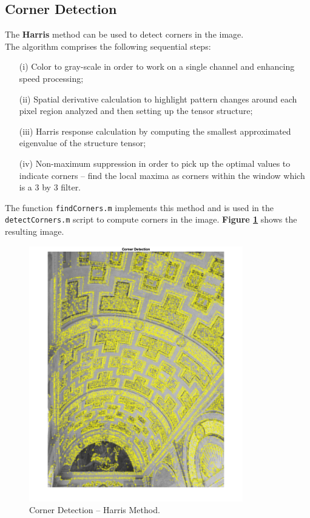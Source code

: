 \documentclass[12pt,a4paper]{article}
\begin{document}
\subsection{Corner Detection}
\label{sec:cornerDetection}
The \textbf{Harris} method can be used to detect corners in the image.\\

The algorithm comprises the following sequential steps:
\begin{itemize}
    \item[(i)] Color to gray-scale in order to work on a single channel and enhancing speed processing;
    \item[(ii)] Spatial derivative calculation to highlight pattern changes around each pixel region analyzed and then setting up the tensor structure;
    \item[(iii)] Harris response calculation by computing the smallest approximated eigenvalue of the structure tensor;
    \item[(iv)] Non-maximum suppression in order to pick up the optimal values to indicate corners -- find the local maxima as corners within the window which is a 3 by 3 filter.
\end{itemize}
\bigskip
The function \verb|findCorners.m| implements this method and is used in the \verb|detectCorners.m| script to compute corners in the image. \textbf{Figure \ref{fig:corners}} shows the resulting image.

\begin{figure}[H]
    \centering
    \includegraphics[width=0.83\textwidth]{Images/PalazzoTe_corners.png}
    \caption[Corner Detection -- Harris Method.]{Corner Detection -- Harris Method.}
    \label{fig:corners}
\end{figure}
\end{document}
